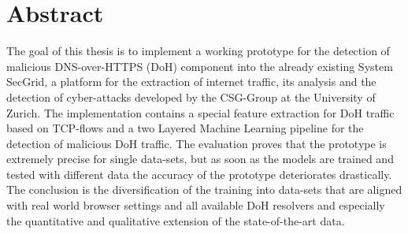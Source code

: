 \chapter*{Abstract}





The goal of this thesis is to implement a working prototype for the detection of malicious DNS-over-HTTPS (DoH) component into the already existing System SecGrid, a platform for the extraction of internet traffic, its analysis and the detection of cyber-attacks developed by the CSG-Group at the University of Zurich. The implementation contains a special feature extraction for DoH traffic based on TCP-flows and a two Layered Machine Learning pipeline for the detection of malicious DoH traffic. The evaluation proves that the prototype is extremely precise for single data-sets, but as soon as the models are trained and tested with different data the accuracy of the prototype deteriorates drastically. The conclusion is the diversification of the training into data-sets that are aligned with real world browser settings and all available DoH resolvers and especially the quantitative and qualitative extension of the state-of-the-art data.